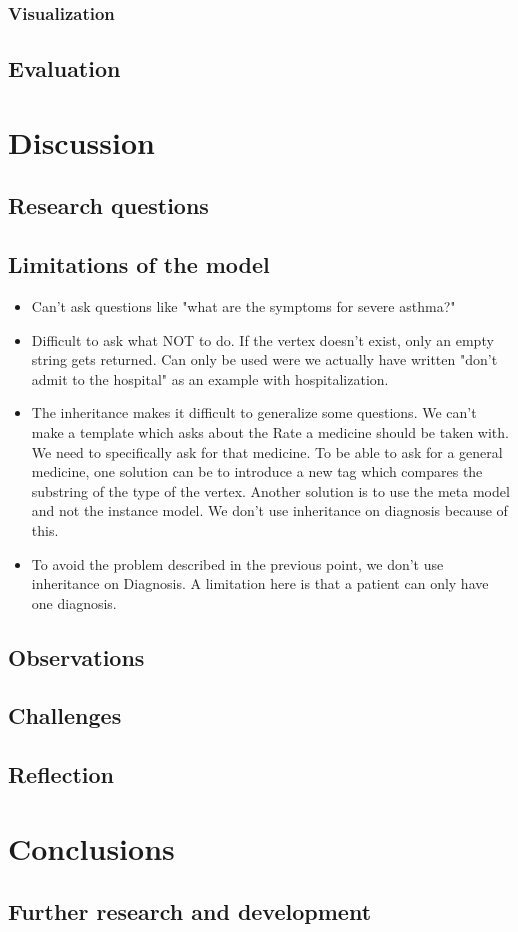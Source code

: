 \documentclass[a4paper,12pt]{book}
\begin{document}
\subsection{Visualization}
\section{Evaluation}



\chapter{Discussion}
\section{Research questions}
\section{Limitations of the model}
\begin{itemize}
	\item Can't ask questions like "what are the symptoms for severe asthma?"
	\item Difficult to ask what NOT to do. If the vertex doesn't exist, only an empty string gets returned. Can only be used were we actually have written "don't admit to the hospital" as an example with hospitalization.
	\item The inheritance makes it difficult to generalize some questions. We can't make a template which asks about the Rate a medicine should be taken with. We need to specifically ask for that medicine. To be able to ask for a general medicine, one solution can be to introduce a new tag which compares the substring of the type of the vertex. Another solution is to use the meta model and not the instance model. We don't use inheritance on diagnosis because of this.
	\item To avoid the problem described in the previous point, we don't use inheritance on Diagnosis. A limitation here is that  
	a patient can only have one diagnosis.
\end{itemize}
\section{Observations}
\section{Challenges}
\section{Reflection}



\chapter{Conclusions}
\section{Further research and development}


\backmatter
\printbibliography
\end{document}
